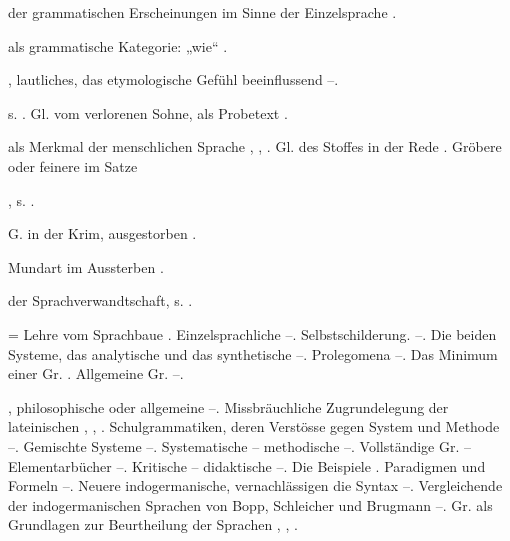 \begin{register}
 der grammatischen Erscheinungen im Sinne der Einzelsprache \pageref{sp.90}.

 als grammatische Kategorie: „wie“ \pageref{sp.103}.


, lautliches, das etymologische Gefühl beeinflussend \pageref{sp.214}–\pageref{sp.216}.

 s. . Gl. vom verlorenen Sohne, als Probetext \pageref{sp.106}. 

 als Merkmal der menschlichen Sprache \pageref{sp.3}, \pageref{sp.5}, \sed{\pageref{sp.310},} \pageref{sp.346}. Gl. des Stoffes in der Rede \pageref{sp.324}. Gröbere oder feinere im Satze 


, s. .


  G. in der Krim, ausgestorben \pageref{sp.146}.

 Mundart im Aussterben \pageref{sp.146}.

 der Sprachverwandtschaft, s. .

 = Lehre vom Sprachbaue \pageref{sp.81}. Einzelsprachliche \pageref{sp.81}–\pageref{sp.121}. Selbstschilderung.  \pageref{sp.82}–\pageref{sp.83}. Die beiden Systeme, das analytische und das synthetische \pageref{sp.84}–\pageref{sp.86}. Prolegomena \pageref{sp.86}–\pageref{sp.88}. Das Minimum einer Gr. \pageref{sp.385}. Allgemeine Gr. \pageref{sp.479}–\pageref{sp.482}.

, philosophische oder allgemeine \pageref{sp.10}–\pageref{sp.11}. Missbräuchliche Zugrundelegung der lateinischen \pageref{sp.25}, \pageref{sp.52}, \sed{\pageref{sp.91},} \pageref{sp.105}. Schulgrammatiken, deren Verstösse gegen System und Methode \pageref{sp.81}–\pageref{sp.82}.  Gemischte Systeme \pageref{sp.91}–\pageref{sp.92}.  Systematische – methodische \pageref{sp.109}–\pageref{sp.110}. Vollständige Gr. – Elementarbücher \pageref{sp.110}–\pageref{sp.113}. Kritische – didaktische \pageref{sp.113}–\pageref{sp.114}. Die Beispiele \pageref{sp.116}. Paradigmen und Formeln \pageref{sp.116}–\pageref{sp.119}.  Neuere indogermanische, vernachlässigen die Syntax \pageref{sp.137}–\pageref{sp.138}. Vergleichende der indogermanischen Sprachen von Bopp, Schleicher und Brugmann \pageref{sp.170}–\pageref{sp.173}. Gr. als Grundlagen zur Beurtheilung der Sprachen \pageref{sp.406}, \pageref{sp.450}, \pageref{sp.471}.


\end{register}
